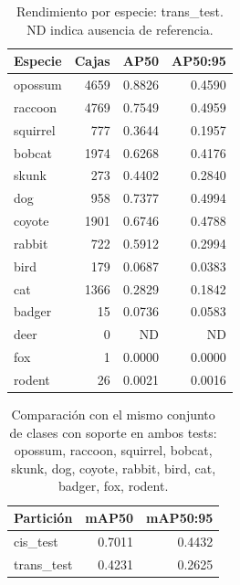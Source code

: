 \begin{table}[H]
\centering\small
\caption{Rendimiento por especie: trans\_test. ND indica ausencia de referencia.}
\begin{tabular}{lrrr}
\toprule
Especie & Cajas & AP50 & AP50:95 \\
\midrule
opossum & 4659 & 0.8826 & 0.4590 \\
raccoon & 4769 & 0.7549 & 0.4959 \\
squirrel & 777 & 0.3644 & 0.1957 \\
bobcat & 1974 & 0.6268 & 0.4176 \\
skunk & 273 & 0.4402 & 0.2840 \\
dog & 958 & 0.7377 & 0.4994 \\
coyote & 1901 & 0.6746 & 0.4788 \\
rabbit & 722 & 0.5912 & 0.2994 \\
bird & 179 & 0.0687 & 0.0383 \\
cat & 1366 & 0.2829 & 0.1842 \\
badger & 15 & 0.0736 & 0.0583 \\
deer & 0 & ND & ND \\
fox & 1 & 0.0000 & 0.0000 \\
rodent & 26 & 0.0021 & 0.0016 \\
\bottomrule
\end{tabular}
\end{table}

\begin{table}[H]
\centering\small
\caption{Comparación con el mismo conjunto de clases con soporte en ambos tests: opossum, raccoon, squirrel, bobcat, skunk, dog, coyote, rabbit, bird, cat, badger, fox, rodent.}
\begin{tabular}{lrr}
\toprule
Partición & mAP50 & mAP50:95 \\
\midrule
cis\_test & 0.7011 & 0.4432 \\
trans\_test & 0.4231 & 0.2625 \\
\bottomrule
\end{tabular}
\end{table}

